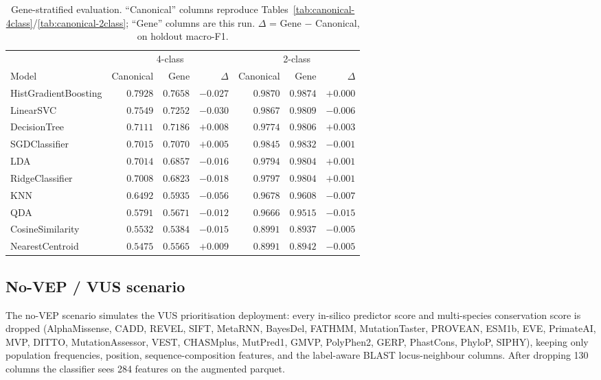 \documentclass[11pt,a4paper]{article}
\begin{document}
\begin{table}[H]
\centering
\caption{Gene-stratified evaluation. ``Canonical'' columns reproduce
Tables~\ref{tab:canonical-4class}/\ref{tab:canonical-2class}; ``Gene''
columns are this run. $\Delta$ = Gene $-$ Canonical, on holdout macro-F1.}
\label{tab:gene-strat}
\small
\begin{tabular}{lrrrrrr}
\toprule
 & \multicolumn{3}{c}{4-class} & \multicolumn{3}{c}{2-class} \\
\cmidrule(lr){2-4} \cmidrule(lr){5-7}
Model & Canonical & Gene & $\Delta$ & Canonical & Gene & $\Delta$ \\
\midrule
HistGradientBoosting & $0.7928$ & $0.7658$ & $-0.027$ & $0.9870$ & $0.9874$ & $+0.000$ \\
LinearSVC & $0.7549$ & $0.7252$ & $-0.030$ & $0.9867$ & $0.9809$ & $-0.006$ \\
DecisionTree & $0.7111$ & $0.7186$ & $+0.008$ & $0.9774$ & $0.9806$ & $+0.003$ \\
SGDClassifier & $0.7015$ & $0.7070$ & $+0.005$ & $0.9845$ & $0.9832$ & $-0.001$ \\
LDA & $0.7014$ & $0.6857$ & $-0.016$ & $0.9794$ & $0.9804$ & $+0.001$ \\
RidgeClassifier & $0.7008$ & $0.6823$ & $-0.018$ & $0.9797$ & $0.9804$ & $+0.001$ \\
KNN & $0.6492$ & $0.5935$ & $-0.056$ & $0.9678$ & $0.9608$ & $-0.007$ \\
QDA & $0.5791$ & $0.5671$ & $-0.012$ & $0.9666$ & $0.9515$ & $-0.015$ \\
CosineSimilarity & $0.5532$ & $0.5384$ & $-0.015$ & $0.8991$ & $0.8937$ & $-0.005$ \\
NearestCentroid & $0.5475$ & $0.5565$ & $+0.009$ & $0.8991$ & $0.8942$ & $-0.005$ \\
\bottomrule
\end{tabular}
\end{table}

\subsection{No-VEP / VUS scenario}
\label{sec:no-vep}

The no-VEP scenario simulates the VUS prioritisation deployment: every
in-silico predictor score and multi-species conservation score is dropped
(AlphaMissense, CADD, REVEL, SIFT, MetaRNN, BayesDel, FATHMM, MutationTaster,
PROVEAN, ESM1b, EVE, PrimateAI, MVP, DITTO, MutationAssessor, VEST,
CHASMplus, MutPred1, GMVP, PolyPhen2, GERP, PhastCons, PhyloP, SIPHY), keeping
only population frequencies, position, sequence-composition features, and the
label-aware BLAST locus-neighbour columns. After dropping 130 columns the
classifier sees 284 features on the augmented parquet.
\end{document}
